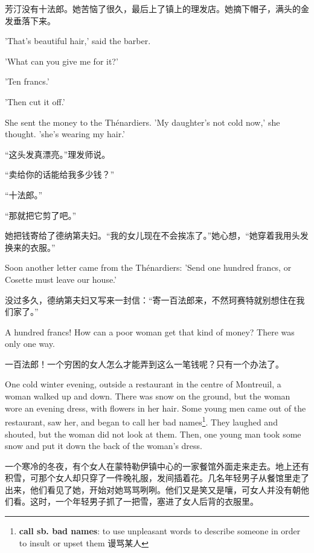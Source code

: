 \documentclass[fontset=ubuntu, zihao=5]{ctexart}
\begin{document}
\begin{paracol}{2}
\switchcolumn

芳汀没有十法郎。她苦恼了很久，最后上了镇上的理发店。她摘下帽子，满头的金发垂落下来。

\switchcolumn*

'That's beautiful hair,' said the barber.


'What can you give me for it?'


'Ten francs.'


'Then cut it off.'


She sent the money to the Thénardiers. 'My daughter's not cold now,' she thought. 'she's wearing my hair.'

\switchcolumn

“这头发真漂亮。”理发师说。


“卖给你的话能给我多少钱？”


“十法郎。”


“那就把它剪了吧。”


她把钱寄给了德纳第夫妇。“我的女儿现在不会挨冻了。”她心想，“她穿着我用头发换来的衣服。”

\switchcolumn*

Soon another letter came from the Thénardiers: 'Send one hundred francs, or Cosette must leave our house.'

\switchcolumn

没过多久，德纳第夫妇又写来一封信：“寄一百法郎来，不然珂赛特就别想住在我们家了。”

\switchcolumn*

A hundred francs! How can a poor woman get that kind of money? There was only one way.

\switchcolumn

一百法郎！一个穷困的女人怎么才能弄到这么一笔钱呢？只有一个办法了。

\switchcolumn*

One cold winter evening, outside a restaurant in the centre of Montreuil, a
woman walked up and down. There was snow on the ground, but the woman wore
an evening dress, with flowers in her hair. Some young men came out of the
restaurant, saw her, and began to call her bad names\footnote{\textbf{call
    sb. bad names}: to use unpleasant words to describe someone in order to
  insult or upset them 谩骂某人}. They laughed and shouted, but the woman
did not look at them. Then, one young man took some snow and put it down the
back of the woman's dress.

\switchcolumn

一个寒冷的冬夜，有个女人在蒙特勒伊镇中心的一家餐馆外面走来走去。地上还有积雪，可那个女人却只穿了一件晚礼服，发间插着花。几名年轻男子从餐馆里走了出来，他们看见了她，开始对她骂骂咧咧。他们又是笑又是嚷，可女人并没有朝他们看。这时，一个年轻男子抓了一把雪，塞进了女人后背的衣服里。


\end{paracol}
\end{document}
